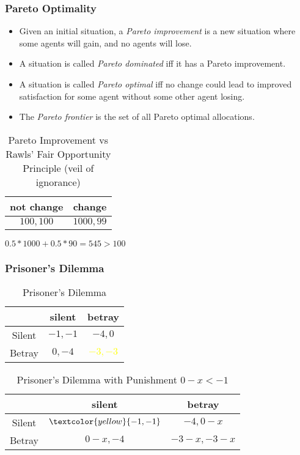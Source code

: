 \documentclass[UTF8,11pt,colorlinks,compress,openany]{beamer}%
\begin{document}
\begin{frame}\frametitle{Pareto Optimality}
\vspace*{-1ex}
\begin{center}
\end{center}\vspace*{-1ex}
\begin{itemize}
	\item Given an initial situation, a \emph{Pareto improvement} is a new situation where some agents will gain, and no agents will lose.
	\item A situation is called \emph{Pareto dominated} iff it has a Pareto improvement.
	\item A situation is called \emph{Pareto optimal} iff no change could lead to improved satisfaction for some agent without some other agent losing.
	\item The \emph{Pareto frontier} is the set of all Pareto optimal allocations.
\end{itemize}
\begin{table}
\begin{tabu}{c|c}
\hline
not change & change\\
\hline
$100,100$ & $1000,99$\\
\hline
\end{tabu}\caption{Pareto Improvement vs Rawls' Fair Opportunity Principle (veil of ignorance)}
$0.5*1000+0.5*90=545>100$
\end{table}
\end{frame}

\begin{frame}\frametitle{Prisoner's Dilemma}
\begin{table}
\begin{tabu}{c|cc}
\hline
 & silent & betray\\
\hline
Silent & $-1,-1$ & $-4,0$\\
Betray & $0,-4$ &\textcolor{yellow}{$-3,-3$}\\
\hline
\end{tabu}\caption{Prisoner's Dilemma}
\end{table}
\begin{table}
\begin{tabu}{c|cc}
\hline
 & silent & betray\\
\hline
Silent & $\textcolor{yellow}{-1,-1}$ & $-4,0-x$\\
Betray & $0-x,-4$ &$-3-x,-3-x$\\
\hline
\end{tabu}\caption{Prisoner's Dilemma with Punishment $0-x<-1$}
\end{table}	
\end{frame}
\end{document}
